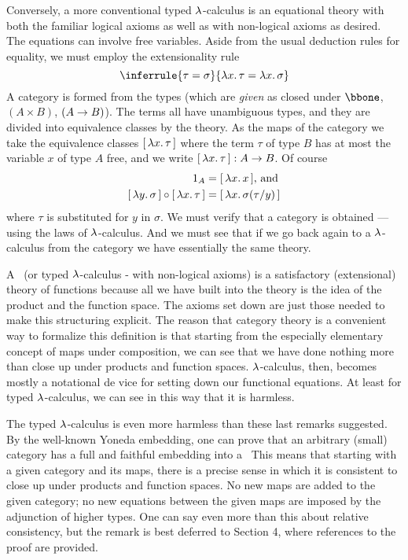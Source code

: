 Conversely, a more conventional typed $\lambda$-calculus is an equational theory with both the familiar logical axioms as well as with non-logical axioms as desired. The equations can involve free variables. Aside from the usual deduction rules for equality, we must employ the extensionality rule
$$
\inferrule
  {\tau = \sigma}
  {\l x .\, \tau = \l x .\, \sigma}
$$
%
A category is formed from the types (which are {\it given} as closed under $\bbone$, $(A \times B)$, $(A \rightarrow B)$). The terms all have unambiguous
types, and they are divided into equivalence classes by the theory. As the maps of the category we take the equivalence classes $\br{\lm{x}.\tau}$ where the term $\tau$ of type $B$ has at most the variable $x$ of type $A$ free, and we write $\br{\lm{x}.\tau} : \AB$. Of course
\begin{align*}
\id_A &= \br{\lm{x}.x}, \, \textrm{and}\\
\br{\lm{y}.\sigma} \comp \br{\lm{x}.\tau} &= \br{\lm{x}.\sigma(\tau/y)}
\end{align*}
where $\tau$ is substituted for $y$ in $\sigma$. We must verify that a category is obtained --- using the laws of $\lambda$-calculus.  And we must
see that if we go back again to a $\lambda$-calculus from the category we have essentially the same theory.

A \ccc\ (or typed $\lambda$-calculus - with non-logical axioms) is a satisfactory (extensional) theory of functions because all we have built into the theory is the idea of the product and the function space. The axioms set down are just those needed to make this structuring explicit.
The reason that category theory is a convenient way to formalize this definition is that starting from the especially elementary concept of maps under composition, we can see that we have done nothing more than close up under products and function spaces. $\lambda$-calculus, then, becomes mostly a notational de vice for setting down our functional equations. At least for typed $\lambda$-calculus, we can see in this way that it is harmless.

The typed $\lambda$-calculus is even more harmless than these last remarks suggested. By the well-known Yoneda embedding, one can prove that an arbitrary (small) category has a full and faithful embedding into a \ccc\ This means that starting with a given category and its maps, there is a precise sense in which it is consistent to close up under products and function spaces. No new maps are added to the given category; no new equations between the given maps are imposed by the adjunction of higher types. One can say even more than this about relative consistency, but the remark is best deferred to Section 4, where references to the proof are provided.

